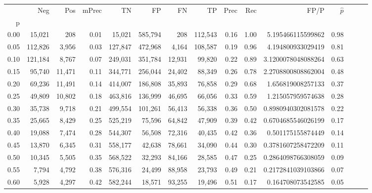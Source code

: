 \begin{tabular}{rrrrrrrrrrrrrrr}
\toprule
{} &      Neg &     Pos & mPrec &       TN &       FP &       FN &       TP &  Prec &   Rec &                  FP/P & $\hat{p}$ \\
p    &          &         &       &          &          &          &          &       &       &                       &           \\
\midrule
0.00 &   15,021 &     208 &  0.01 &   15,021 &  585,794 &      208 &  112,543 &  0.16 &  1.00 &     5.195466115599862 &      0.98 \\
0.05 &  112,826 &   3,956 &  0.03 &  127,847 &  472,968 &    4,164 &  108,587 &  0.19 &  0.96 &     4.194800933029419 &      0.81 \\
0.10 &  121,184 &   8,767 &  0.07 &  249,031 &  351,784 &   12,931 &   99,820 &  0.22 &  0.89 &    3.1200078048088264 &      0.63 \\
0.15 &   95,740 &  11,471 &  0.11 &  344,771 &  256,044 &   24,402 &   88,349 &  0.26 &  0.78 &    2.2708800808862004 &      0.48 \\
0.20 &   69,236 &  11,491 &  0.14 &  414,007 &  186,808 &   35,893 &   76,858 &  0.29 &  0.68 &     1.656819008257133 &      0.37 \\
0.25 &   49,809 &  10,802 &  0.18 &  463,816 &  136,999 &   46,695 &   66,056 &  0.33 &  0.59 &     1.215057959574638 &      0.28 \\
0.30 &   35,738 &   9,718 &  0.21 &  499,554 &  101,261 &   56,413 &   56,338 &  0.36 &  0.50 &    0.8980940302081578 &      0.22 \\
0.35 &   25,665 &   8,429 &  0.25 &  525,219 &   75,596 &   64,842 &   47,909 &  0.39 &  0.42 &    0.6704685546026199 &      0.17 \\
0.40 &   19,088 &   7,474 &  0.28 &  544,307 &   56,508 &   72,316 &   40,435 &  0.42 &  0.36 &     0.501175155874449 &      0.14 \\
0.45 &   13,870 &   6,345 &  0.31 &  558,177 &   42,638 &   78,661 &   34,090 &  0.44 &  0.30 &    0.3781607258472209 &      0.11 \\
0.50 &   10,345 &   5,505 &  0.35 &  568,522 &   32,293 &   84,166 &   28,585 &  0.47 &  0.25 &    0.2864098766308059 &      0.09 \\
0.55 &    7,794 &   4,792 &  0.38 &  576,316 &   24,499 &   88,958 &   23,793 &  0.49 &  0.21 &    0.2172841039103866 &      0.07 \\
0.60 &    5,928 &   4,297 &  0.42 &  582,244 &   18,571 &   93,255 &   19,496 &  0.51 &  0.17 &     0.164708073542585 &      0.05 \\

\end{tabular}
